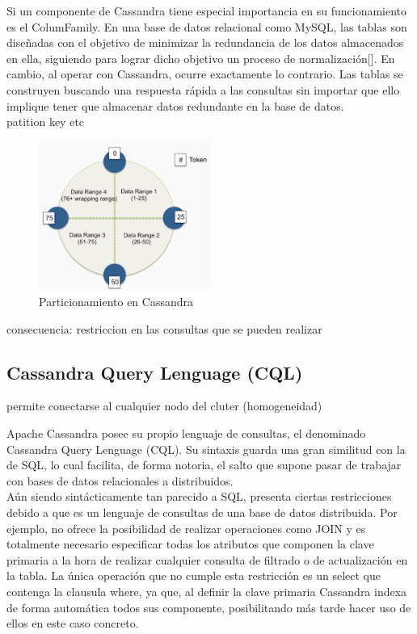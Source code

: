 Si un componente de Cassandra tiene especial importancia en su funcionamiento es el ColumFamily. En una base de datos relacional como MySQL, las tablas son diseñadas con el objetivo de minimizar la redundancia de los datos almacenados en ella, siguiendo para lograr dicho objetivo un proceso de normalización[]. En cambio, al operar con Cassandra, ocurre exactamente lo contrario. Las tablas se construyen buscando una respuesta rápida a las consultas sin importar que ello implique tener que almacenar datos redundante en la base de datos.\\

patition key etc



\begin{figure}[h]
	\centering
	\includegraphics[width=0.5\textwidth]{Ilustraciones/cassandra_token.png}
	\caption{Particionamiento en Cassandra}
	\label{fig:cassandra_token}
\end{figure}

consecuencia: restriccion en las consultas que se pueden realizar

\subsection{Cassandra Query Lenguage (CQL)}

permite conectarse al cualquier nodo del cluter (homogeneidad)

Apache Cassandra posee su propio lenguaje de consultas, el denominado Cassandra Query Lenguage (CQL). Su sintaxis guarda una gran similitud con la de SQL, lo cual facilita, de forma notoria, el salto que supone pasar de trabajar con bases de datos relacionales a distribuidos.\\

Aún siendo sintácticamente  tan parecido a SQL, presenta ciertas restricciones debido a que es un lenguaje de consultas de una base de datos distribuida. Por ejemplo, no ofrece la posibilidad de realizar operaciones como JOIN y es totalmente necesario especificar todas los atributos que componen la clave primaria a la hora de realizar cualquier consulta de filtrado o de actualización en la tabla. La única operación que no cumple esta restricción es un select que contenga la clausula where, ya que, al definir la clave primaria Cassandra indexa de forma automática todos sus componente, posibilitando más tarde  hacer uso de ellos en este caso concreto.

